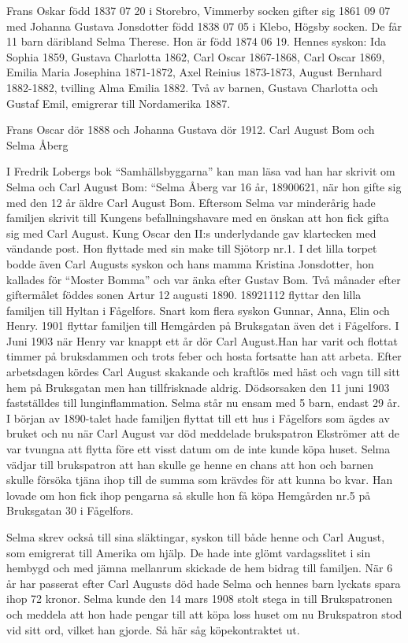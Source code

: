 Frans Oskar född 1837 07 20 i Storebro, Vimmerby socken gifter sig 1861 09 07 med Johanna Gustava Jonsdotter född 1838 07 05 i Klebo, Högsby socken.
De får 11 barn däribland Selma Therese. Hon är född 1874 06 19. 
Hennes syskon: Ida Sophia 1859, Gustava Charlotta 1862, Carl Oscar 1867-1868, Carl Oscar 1869, Emilia Maria Josephina 1871-1872, Axel Reinius 1873-1873, August Bernhard 1882-1882, tvilling Alma Emilia 1882.
Två av barnen, Gustava Charlotta och Gustaf Emil, emigrerar till Nordamerika 1887.


Frans Oscar dör 1888 och Johanna Gustava dör
 1912.
Carl August Bom och Selma Åberg

I Fredrik Lobergs bok “Samhällsbyggarna” kan man läsa vad han har skrivit om Selma och Carl August Bom:
“Selma Åberg var 16 år, 18900621, när hon gifte sig med den 12 år äldre Carl August Bom. Eftersom Selma var minderårig hade familjen skrivit till Kungens befallningshavare med en önskan att hon fick gifta sig med Carl August. Kung Oscar den II:s underlydande gav klartecken med vändande post. 
Hon flyttade med sin make till Sjötorp nr.1. I det lilla torpet bodde även Carl Augusts syskon och hans mamma Kristina Jonsdotter, hon kallades för “Moster Bomma” och var änka efter Gustav Bom.
Två månader efter giftermålet föddes sonen Artur 12 augusti 1890.
18921112 flyttar den lilla familjen till Hyltan i Fågelfors.  Snart kom flera syskon Gunnar, Anna, Elin och Henry. 1901 flyttar familjen till Hemgården på Bruksgatan även det i Fågelfors.  I Juni 1903 när Henry var knappt ett år dör Carl August.Han har varit och flottat timmer på bruksdammen och trots feber och hosta fortsatte han att arbeta. Efter arbetsdagen kördes Carl August skakande och kraftlös med häst och vagn till sitt hem på Bruksgatan men han tillfrisknade aldrig. Dödsorsaken den 11 juni 1903 fastställdes till lunginflammation. Selma står nu ensam med 5 barn, endast 29 år. I början av 1890-talet hade familjen flyttat till ett hus i Fågelfors som ägdes av bruket och nu när Carl August var död meddelade brukspatron Ekströmer att de var tvungna att flytta före ett visst datum om de inte kunde köpa huset. Selma vädjar till brukspatron att han skulle ge henne en chans att hon och barnen skulle försöka tjäna ihop till de summa som krävdes för att kunna bo kvar. Han lovade om hon fick ihop pengarna så skulle hon få köpa Hemgården nr.5 på Bruksgatan 30 i Fågelfors.

Selma skrev också till sina släktingar, syskon till både henne och Carl August, som emigrerat till Amerika om hjälp. De hade inte glömt vardagsslitet i sin hembygd och med jämna mellanrum skickade de hem bidrag till familjen.
När 6 år har passerat efter Carl Augusts död hade Selma och hennes barn lyckats spara ihop 72 kronor.
 Selma kunde den 14 mars 1908 stolt stega in till Brukspatronen och meddela att hon hade pengar till att köpa loss huset om nu Brukspatron stod vid sitt ord, vilket han gjorde.
Så här såg köpekontraktet ut.


